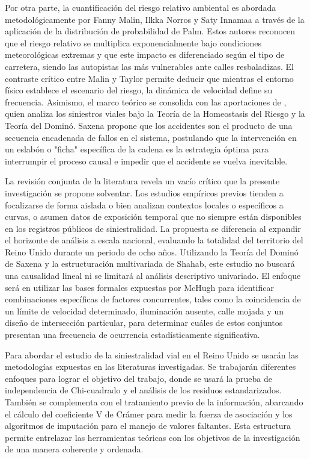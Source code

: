 \documentclass[12pt]{article}
\begin{document}
Por otra parte, la cuantificación del riesgo relativo ambiental es abordada metodológicamente por Fanny Malin, Ilkka Norros y Saty Innamaa a través de la aplicación de la distribución de probabilidad de Palm. Estos autores reconocen que el riesgo relativo se multiplica exponencialmente bajo condiciones meteorológicas extremas y que este impacto es diferenciado según el tipo de carretera, siendo las autopistas las más vulnerables ante calles resbaladizas. El contraste crítico entre Malin y Taylor permite deducir que mientras el entorno físico establece el escenario del riesgo, la dinámica de velocidad define su frecuencia. Asimismo, el marco teórico se consolida con las aportaciones de \textcite{SAXENA2017}, quien analiza los siniestros viales bajo la Teoría de la Homeostasis del Riesgo y la Teoría del Dominó. Saxena propone que los accidentes son el producto de una secuencia encadenada de fallos en el sistema, postulando que la intervención en un eslabón o "ficha" específica de la cadena es la estrategia óptima para interrumpir el proceso causal e impedir que el accidente se vuelva inevitable.

La revisión conjunta de la literatura revela un vacío crítico que la presente investigación se propone solventar. Los estudios empíricos previos tienden a focalizarse de forma aislada o bien analizan contextos locales o específicos a curvas, o asumen datos de exposición temporal que no siempre están disponibles en los registros públicos de siniestralidad. La propuesta se diferencia al expandir el horizonte de análisis a escala nacional, evaluando la totalidad del territorio del Reino Unido durante un periodo de ocho años. Utilizando la Teoría del Dominó de Saxena y la estructuración multivariada de Shahab, este estudio no buscará una causalidad lineal ni se limitará al análisis descriptivo univariado. El enfoque será en utilizar las bases formales expuestas por McHugh para identificar combinaciones específicas de factores concurrentes, tales como la coincidencia de un límite de velocidad determinado, iluminación ausente, calle mojada y un diseño de intersección particular,  para determinar cuáles de estos conjuntos presentan una frecuencia de ocurrencia estadísticamente significativa.

Para abordar el estudio de la siniestralidad vial en el Reino Unido se usarán las metodologías expuestas en las literaturas investigadas. Se trabajarán diferentes enfoques para lograr el objetivo del trabajo, donde se usará la prueba de independencia de Chi-cuadrado y el análisis de los residuos estandarizados. También se complementa  con el tratamiento previo de la información, abarcando el cálculo del coeficiente V de Crámer para medir la fuerza de asociación y los algoritmos de imputación para el manejo de valores faltantes. Esta estructura permite entrelazar las herramientas teóricas con los objetivos de la investigación de una manera coherente y ordenada.
\end{document}

